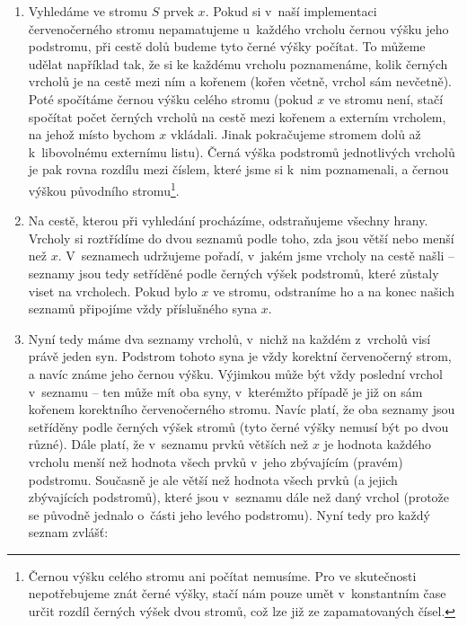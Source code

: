 \begin{enumerate}

\item Vyhledáme ve stromu $S$ prvek $x$. Pokud si v~naší implementaci
červenočerného stromu nepamatujeme u~každého vrcholu černou výšku jeho
podstromu, při cestě dolů budeme tyto černé výšky počítat. To můžeme udělat
například tak, že si ke každému vrcholu poznamenáme, kolik černých vrcholů je
na cestě mezi ním a kořenem (kořen včetně, vrchol sám nevčetně). Poté spočítáme
černou výšku celého stromu (pokud $x$ ve stromu není, stačí spočítat počet
černých vrcholů na cestě mezi kořenem a externím vrcholem, na jehož místo
bychom $x$ vkládali. Jinak pokračujeme stromem dolů až k~libovolnému externímu
listu). Černá výška podstromů jednotlivých vrcholů je pak rovna rozdílu mezi číslem,
které jsme si k~nim poznamenali, a černou výškou původního
stromu\footnote{Černou výšku celého stromu ani počítat nemusíme.
Pro  ve skutečnosti nepotřebujeme znát černé výšky, stačí nám pouze umět
v~konstantním čase určit rozdíl černých výšek dvou stromů, což lze již ze
zapamatovaných čísel.}.

\item Na cestě, kterou při vyhledání procházíme, odstraňujeme všechny hrany.
Vrcholy si roztřídíme do dvou seznamů podle toho, zda jsou větší nebo menší než
$x$. V~seznamech udržujeme pořadí, v~jakém jsme vrcholy na cestě našli --
seznamy jsou tedy setříděné podle černých výšek podstromů, které zůstaly viset na
vrcholech. Pokud bylo $x$ ve stromu, odstraníme ho a na konec našich seznamů
připojíme vždy příslušného syna $x$.

\item Nyní tedy máme dva seznamy vrcholů, v~nichž na každém z~vrcholů visí
právě jeden syn. Podstrom tohoto syna je vždy korektní červenočerný strom, a
navíc známe jeho černou výšku. Výjimkou může být vždy poslední vrchol v~seznamu
-- ten může mít oba syny, v~kterémžto případě je již on sám kořenem korektního
červenočerného stromu. Navíc platí, že oba seznamy jsou setříděny podle černých
výšek stromů (tyto černé výšky nemusí být po dvou různé). Dále platí, že
v~seznamu prvků větších než $x$ je hodnota každého vrcholu menší než hodnota všech
prvků v~jeho zbývajícím (pravém) podstromu. Současně je ale větší než hodnota všech prvků
(a jejich zbývajících podstromů), které jsou v~seznamu dále než daný vrchol (protože se
původně jednalo o~části jeho levého podstromu). Nyní tedy pro každý seznam
zvlášť:
\begin{itemize}


\end{itemize}
\end{enumerate}
